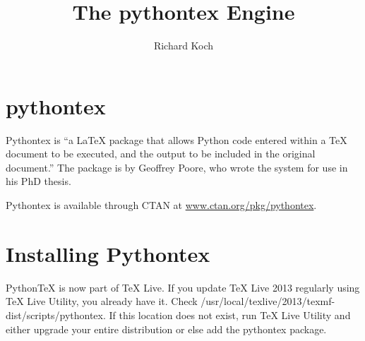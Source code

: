 \documentclass[11pt, oneside]{amsart}
\title{The pythontex Engine}
\author{Richard Koch}
\begin{document}
\maketitle
\vspace{-.3in}
\section{pythontex}
Pythontex is ``a LaTeX package that allows Python code entered within a TeX document to be
executed, and the output to be included in the original document.'' The package is by
Geoffrey Poore, who wrote the system for use in his PhD thesis.

Pythontex is available through CTAN at \href{http://www.ctan.org/pkg/pythontex}{www.ctan.org/pkg/pythontex}. 

\section{Installing Pythontex}

PythonTeX is now part of TeX Live. If you update TeX Live 2013 regularly using TeX Live Utility, you
 already have it. Check /usr/local/texlive/2013/texmf-dist/scripts/pythontex. If this location does not
exist, run TeX Live Utility and either upgrade your entire distribution or else add the pythontex package.
\end{document}
